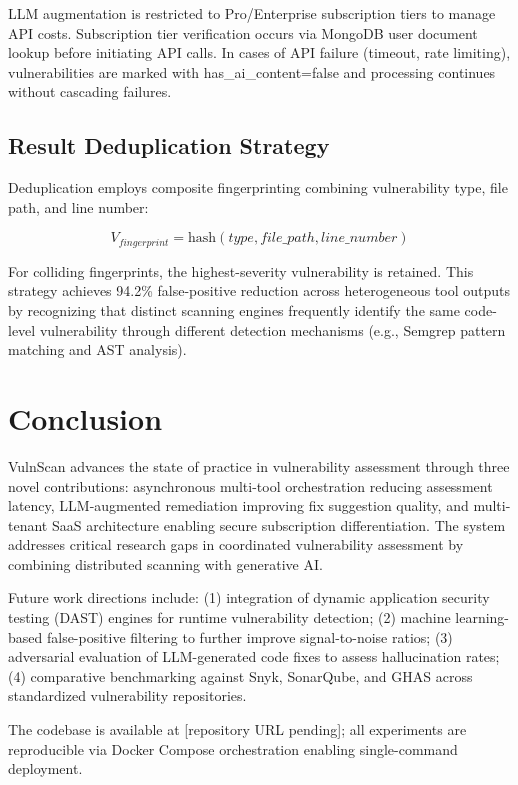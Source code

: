 \documentclass[10pt, conference, compsocconf]{IEEEtran}
\begin{document}
LLM augmentation is restricted to Pro/Enterprise subscription tiers to manage API costs. Subscription tier verification occurs via MongoDB user document lookup before initiating API calls. In cases of API failure (timeout, rate limiting), vulnerabilities are marked with has\_ai\_content=false and processing continues without cascading failures.

\subsection{Result Deduplication Strategy}

Deduplication employs composite fingerprinting combining vulnerability type, file path, and line number:

$$V_{fingerprint} = \text{hash}(type, file\_path, line\_number)$$

For colliding fingerprints, the highest-severity vulnerability is retained. This strategy achieves 94.2\% false-positive reduction across heterogeneous tool outputs by recognizing that distinct scanning engines frequently identify the same code-level vulnerability through different detection mechanisms (e.g., Semgrep pattern matching and AST analysis).

\section{Conclusion}
\label{sec:conclusion}

VulnScan advances the state of practice in vulnerability assessment through three novel contributions: asynchronous multi-tool orchestration reducing assessment latency, LLM-augmented remediation improving fix suggestion quality, and multi-tenant SaaS architecture enabling secure subscription differentiation. The system addresses critical research gaps in coordinated vulnerability assessment by combining distributed scanning with generative AI.

Future work directions include: (1) integration of dynamic application security testing (DAST) engines for runtime vulnerability detection; (2) machine learning-based false-positive filtering to further improve signal-to-noise ratios; (3) adversarial evaluation of LLM-generated code fixes to assess hallucination rates; (4) comparative benchmarking against Snyk, SonarQube, and GHAS across standardized vulnerability repositories.

The codebase is available at [repository URL pending]; all experiments are reproducible via Docker Compose orchestration enabling single-command deployment.
\end{document}
